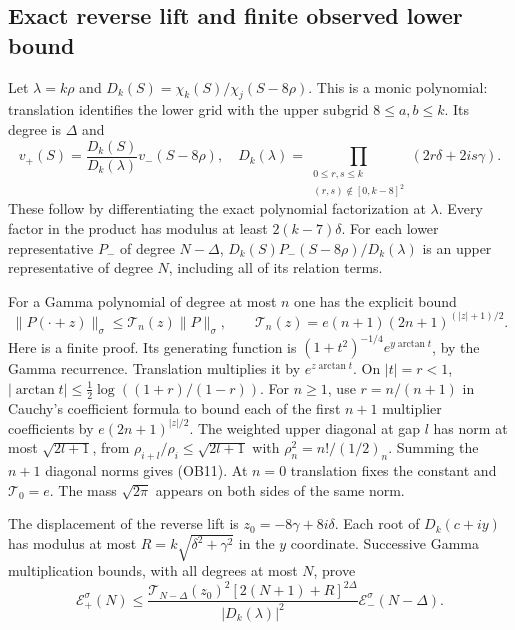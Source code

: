 \documentclass[11pt]{article}
\theoremstyle{remark}\newtheorem{remark}[theorem]{Remark}
\begin{document}
\subsection{Exact reverse lift and finite observed lower bound}
Let $\lambda=k\rho$ and
$D_k(S)=\chi_k(S)/\chi_j(S-8\rho)$. This is a monic polynomial:
translation identifies the lower grid with the upper subgrid
$8\le a,b\le k$. Its degree is $\Delta$ and
\[
 v_+(S)=\frac{D_k(S)}{D_k(\lambda)}v_-(S-8\rho),\quad
 D_k(\lambda)=\prod_{\substack{0\le r,s\le k\\(r,s)\notin[0,k-8]^2}}
 (2r\delta+2is\gamma).\tag{OB10}
\]
These follow by differentiating the exact polynomial factorization at
$\lambda$. Every factor in the product has modulus at least
$2(k-7)\delta$. For each lower representative $P_-$ of degree
$N-\Delta$, $D_k(S)P_-(S-8\rho)/D_k(\lambda)$ is an upper
representative of degree $N$, including all of its relation terms.

For a Gamma polynomial of degree at most $n$ one has the explicit bound
\[
 \|P(\cdot+z)\|_\sigma\le\mathcal T_n(z)\|P\|_\sigma,
 \qquad\mathcal T_n(z)=e(n+1)(2n+1)^{(|z|+1)/2}.\tag{OB11}
\]
Here is a finite proof. Its generating function is
$(1+t^2)^{-1/4}e^{y\arctan t}$, by the Gamma recurrence.
Translation multiplies it by $e^{z\arctan t}$. On $|t|=r<1$,
$|\arctan t|\le\tfrac12\log((1+r)/(1-r))$.
For $n\ge1$, use $r=n/(n+1)$ in Cauchy's coefficient formula to
bound each of the first $n+1$ multiplier coefficients by
$e(2n+1)^{|z|/2}$. The weighted upper diagonal at gap $l$ has norm
at most $\sqrt{2l+1}$, from $\rho_{i+l}/\rho_i\le\sqrt{2l+1}$
with $\rho_n^2=n!/(1/2)_n$. Summing the $n+1$ diagonal norms gives
(OB11). At $n=0$ translation fixes the constant and $\mathcal T_0=e$.
The mass $\sqrt{2\pi}$ appears on both sides of the same norm.

The displacement of the reverse lift is $z_0=-8\gamma+8i\delta$.
Each root of $D_k(c+iy)$ has modulus at most
$R=k\sqrt{\delta^2+\gamma^2}$ in the $y$ coordinate.
Successive Gamma multiplication bounds, with all degrees at most $N$,
prove
\[
 \mathcal E_+^\sigma(N)\le
 \frac{\mathcal T_{N-\Delta}(z_0)^2[2(N+1)+R]^{2\Delta}}
 {|D_k(\lambda)|^2}\mathcal E_-^\sigma(N-\Delta).\tag{OB12}
\]
\end{document}
